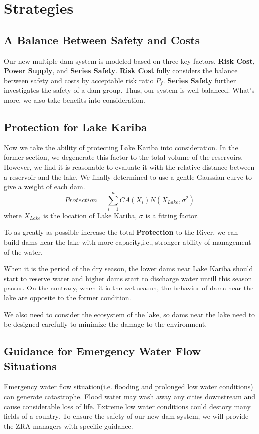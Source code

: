 \documentclass{mcmthesis}
\begin{document}
\section{Strategies}\label{Sec-Strategy}
\subsection{A Balance Between Safety and Costs}
Our new multiple dam system is modeled based on three key factors, \textbf{Risk Cost}, \textbf{Power Supply}, and \textbf{Series Safety}. \textbf{Risk Cost} fully considers the balance between safety and costs by  acceptable risk ratio $P_f$. \textbf{Series Safety} further investigates the safety of a dam group. Thus, our system is well-balanced. What's more, we also take benefits into consideration.

\subsection{Protection for Lake Kariba}
Now we take the ability of protecting Lake Kariba  into consideration. In the former section, we degenerate this factor to the total volume of the reservoirs. However, we find it is reasonable to evaluate it with the relative distance between a reservoir and the lake. We finally determined to use a gentle Gaussian curve to give a weight of each dam.
\begin{equation}
Protection = \sum_{i=1}^{n}CA(X_i)\mathit{N}(X_{Lake},\sigma^2)
\end{equation}
where $X_{Lake}$ is the location of Lake Kariba, $\sigma$ is a fitting factor.

To as greatly as possible increase the total \textbf{Protection} to the River, we can build dams near the lake with more capacity,i.e., stronger ability of management of the water.

When it is the period of the dry season, the lower dams near Lake Kariba should start to reserve water and higher dams start to discharge water untill this season passes. On the contrary, when it is the wet season, the behavior of dams near the lake are opposite to the former condition.

We also need to consider the ecosystem of the lake, so dams near the lake need to be designed carefully to minimize the damage to the environment.

\subsection{Guidance for Emergency Water Flow Situations}
Emergency water flow situation(i.e. flooding and prolonged low water conditions) can generate catastrophe. Flood water may wash away any cities downstream and cause considerable loss of life. Extreme low water conditions could destory many fields of a country. To ensure the safety of our new dam system, we will provide the ZRA managers with specific guidance.
\end{document}

